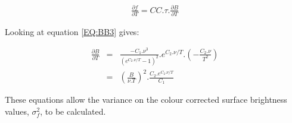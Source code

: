 \begin{eqnarray*}
\frac{\partial f}{\partial T} = CC.\tau.\frac{\partial B}{\partial T}
\end{eqnarray*}

Looking at equation \ref{EQ:BB3} gives:

\begin{eqnarray*}
\frac{\partial B}{\partial T} & = & \frac{-C_{1}.\nu^{3}}{(e^{C_{2}.\nu/T}-1)^{2}}.
                         e^{C_{2}.\nu/T}.\left(-\frac{C_{2}.\nu}{T^{2}}\right)\\
& = & \left(\frac{B}{\nu.T}\right)^{2}.\frac{C_{2}.e^{C_{2}.\nu/T}}{C_{1}}
\end{eqnarray*}

These equations allow the variance on the colour corrected surface brightness
values, $\sigma_{f}^{2}$, to be calculated.



